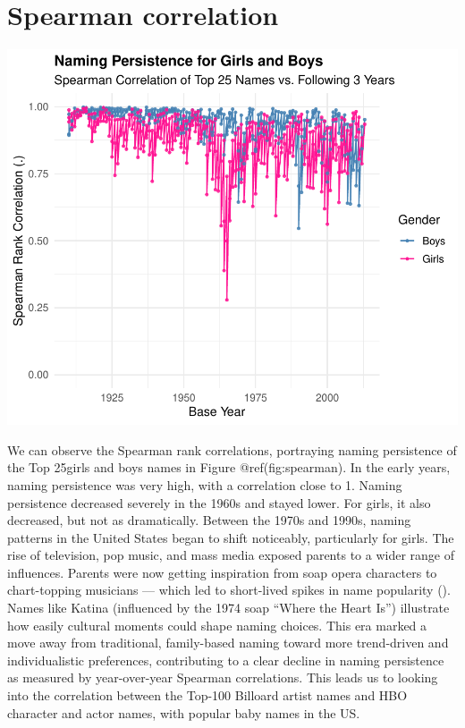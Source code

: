 \documentclass[11pt,preprint]{elsarticle}
\let\origfigure\figure
\let\endorigfigure\endfigure
\renewenvironment{figure}[1][2] {
    \expandafter\origfigure\expandafter[H]
} {
    \endorigfigure
}
\numberwithin{equation}{section}
\numberwithin{figure}{section}
\numberwithin{table}{section}
\begin{document}
\newpage

\section{Spearman correlation}\label{spearman-correlation}

\begin{figure}
\centering
\includegraphics{Question1_files/figure-latex/fig.spearman-1.pdf}
\caption{Figure: Spearman correlation for naming persistence over time}
\end{figure}

We can observe the Spearman rank correlations, portraying naming
persistence of the Top 25girls and boys names in Figure
@ref(fig:spearman). In the early years, naming persistence was very
high, with a correlation close to 1. Naming persistence decreased
severely in the 1960s and stayed lower. For girls, it also decreased,
but not as dramatically. Between the 1970s and 1990s, naming patterns in
the United States began to shift noticeably, particularly for girls. The
rise of television, pop music, and mass media exposed parents to a wider
range of influences. Parents were now getting inspiration from soap
opera characters to chart-topping musicians --- which led to short-lived
spikes in name popularity
(). Names like
Katina (influenced by the 1974 soap ``Where the Heart Is'') illustrate
how easily cultural moments could shape naming choices. This era marked
a move away from traditional, family-based naming toward more
trend-driven and individualistic preferences, contributing to a clear
decline in naming persistence as measured by year-over-year Spearman
correlations. This leads us to looking into the correlation between the
Top-100 Billoard artist names and HBO character and actor names, with
popular baby names in the US.
\end{document}
